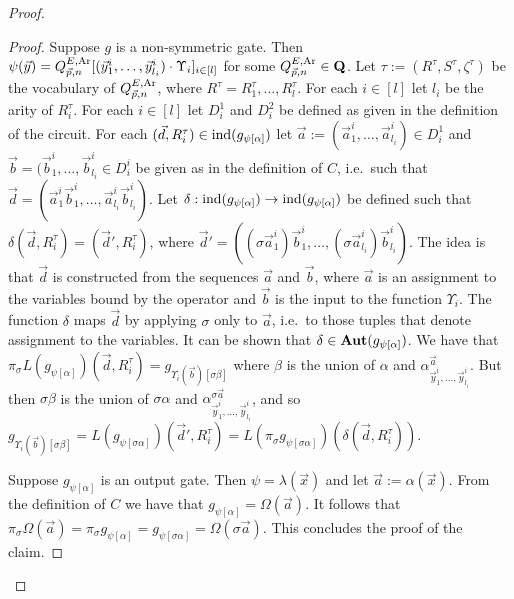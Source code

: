 \documentclass[../main/thesis.tex]{subfiles}
\begin{document}
\begin{proof}
\begin{proof}
  Suppose $g$ is a non-symmetric gate. Then $\psi (\vec{y}) = Q^{E,
    \text{\upshape Ar}}_{\vec{p}, n} [(\vec{y}^i_1, \ldots, \vec{y}^i_{l_i}) \cdot
  \Upsilon_i]_{i \in [l]}$ for some $Q^{E, \text{\upshape Ar}}_{\vec{p}, n} \in \mathbf{Q}$. Let
  $\tau := (R^\tau, S^\tau, \zeta^\tau)$ be the vocabulary of $Q^{E,
    \text{\upshape Ar}}_{\vec{p}, n}$, where $R^\tau = {R^\tau_1, \ldots, R^\tau_l}$. For each
  $i \in [l]$ let $l_i$ be the arity of $R^\tau_i$. For each $i \in [l]$ let
  $D^1_i$ and $D^2_i$ be defined as given in the definition of the circuit. For
  each $(\vec{d}, R^{\tau}_i) \in \text{\upshape ind}(g_{\psi[\alpha]})$ let $\vec{a} :=
  (\vec{a}^i_1, \ldots, \vec{a}^i_{l_i}) \in D^1_i$ and $\vec{b} = (\vec{b}^i_1,
  \ldots, \vec{b}^i_{l_i}\in D^i_i$ be given as in the definition of $C$, i.e.\
  such that $\vec{d} = (\vec{a}^i_1\vec{b}^i_1, \ldots,
  \vec{a}^i_{l_i}\vec{b}^i_{l_i})$. Let $\delta : \text{\upshape ind}(g_{\psi[\alpha]}) \rightarrow
  \text{\upshape ind}(g_{\psi[\alpha]})$ be defined such that $\delta (\vec{d}, R^\tau_i) =
  (\vec{d}', R^{\tau}_i)$, where $\vec{d}' = ((\sigma \vec{a}^i_1)\vec{b}^i_1 ,
  \ldots, (\sigma \vec{a}^i_{l_i}) \vec{b}^i_{l_i})$. The idea is that $\vec{d}$
  is constructed from the sequences $\vec{a}$ and $\vec{b}$, where $\vec{a}$ is
  an assignment to the variables bound by the operator and $\vec{b}$ is the
  input to the function $\Upsilon_i$. The function $\delta$ maps $\vec{d}$ by
  applying $\sigma$ only to $\vec{a}$, i.e.\ to those tuples that denote
  assignment to the variables. It can be shown that $\delta \in
  \text{\textbf{Aut}}(g_{\psi[\alpha]})$. We have that $\pi_{\sigma}
  L(g_{\psi[\alpha]})(\vec{d}, R^\tau_i) = g_{\Upsilon_i (\vec{b})[\sigma
    \beta]}$ where $\beta$ is the union of $\alpha$ and
  $\alpha^{\vec{a}}_{\vec{y}^i_1, \ldots, \vec{y}^i_{l_i}}$. But then $\sigma
  \beta$ is the union of $\sigma \alpha$ and $\alpha^{\sigma
    \vec{a}}_{\vec{y}^i_1, \ldots, \vec{y}^i_{l_i}}$, and so $g_{\Upsilon_i
    (\vec{b})[\sigma \beta]} = L(g_{\psi[\sigma \alpha]})(\vec{d}', R^\tau_i) =
  L(\pi_\sigma g_{\psi [\sigma \alpha]})(\delta (\vec{d}, R^\tau_i))$.

  Suppose $g_{\psi[\alpha]}$ is an output gate. Then $\psi = \lambda (\vec{x})$
  and let $\vec{a} := \alpha(\vec{x})$. From the definition of $C$ we have that
  $g_{\psi[\alpha]} = \Omega(\vec{a})$. It follows that $\pi_{\sigma} \Omega
  (\vec{a}) = \pi_\sigma g_{\psi[\alpha]} = g_{\psi[\sigma \alpha]} =
  \Omega(\sigma \vec{a})$. This concludes the proof of the claim.

\end{proof}


\end{proof}
\end{document}
